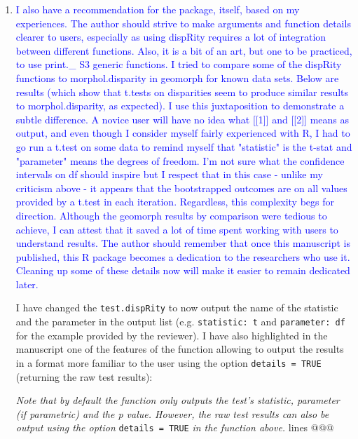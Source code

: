 \documentclass[12pt,letterpaper]{article}
\begin{document}
\begin{enumerate}
\item{\textcolor{blue}{I also have a recommendation for the package, itself, based on my experiences. 
The author should strive to make arguments and function details clearer to users, especially as using dispRity requires a lot of integration between different functions. 
Also, it is a bit of an art, but one to be practiced, to use print.\_ S3 generic functions. 
I tried to compare some of the dispRity functions to morphol.disparity in geomorph for known data sets. 
Below are results (which show that t.tests on disparities seem to produce similar results to morphol.disparity, as expected). 
I use this juxtaposition to demonstrate a subtle difference. 
A novice user will have no idea what [[1]] and [[2]] means as output, and even though I consider myself fairly experienced with R, I had to go run a t.test on some data to remind myself that "statistic" is the t-stat and "parameter" means the degrees of freedom. 
I'm not sure what the confidence intervals on df should inspire but I respect that in this case - unlike my criticism above - it appears that the bootstrapped outcomes are on all values provided by a t.test in each iteration. 
Regardless, this complexity begs for direction. 
Although the geomorph results by comparison were tedious to achieve, I can attest that it saved a lot of time spent working with users to understand results. 
The author should remember that once this manuscript is published, this R package becomes a dedication to the researchers who use it. 
Cleaning up some of these details now will make it easier to remain dedicated later.}}

I have changed the \texttt{test.dispRity} to now output the name of the statistic and the parameter in the output list (e.g. \texttt{statistic: t} and \texttt{parameter: df} for the example provided by the reviewer).
I have also highlighted in the manuscript one of the features of the function allowing to output the results in a format more familiar to the user using the option \texttt{details = TRUE} (returning the raw test results):

\textit{Note that by default the function only outputs the test's statistic, parameter (if parametric) and the p value. However, the raw test results can also be output using the option} \texttt{details = TRUE} \textit{in the function above.} lines @@@

\end{enumerate}



\end{document}
